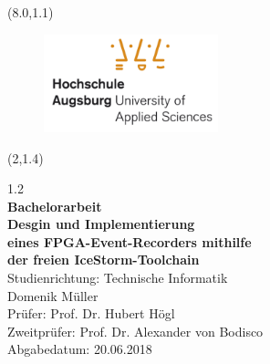 
\textblockorigin{20mm}{30mm}

\thispagestyle{empty}\null
\begin{textblock}{10}(8.0,1.1)
\begin{figure}[h]
	\centering
		\includegraphics[width=0.45\textwidth]{logos/hsa_informatik_logo_lq.pdf}
\end{figure}

\end{textblock}


\begin{textblock}{15}(2,1.4)
	\begin{flushleft}
		\begin{spacing} {1.2}
			\LARGE	
				\vspace{150pt}
				\textcolor[rgb]{1,0.41,0.13}{\\
				\textbf{Bachelorarbeit}}\\
				\vspace{10pt}
			\LARGE   \textbf{Desgin und Implementierung \\eines FPGA-Event-Recorders mithilfe \\der freien IceStorm-Toolchain} \\			
			\Large
				\vspace{10pt}		
				Studienrichtung: Technische Informatik\\
				\vspace{30pt}
				Domenik Müller\\
				\vspace{110pt}		
				\vspace{80pt}		
			\Large
				Prüfer: Prof. Dr. Hubert Högl\\
				Zweitprüfer: Prof. Dr. Alexander von Bodisco\\ 
				\vspace{7pt}		
				Abgabedatum: 20.06.2018\\
			\end{spacing}
		\end{flushleft}
		
\end{textblock}



